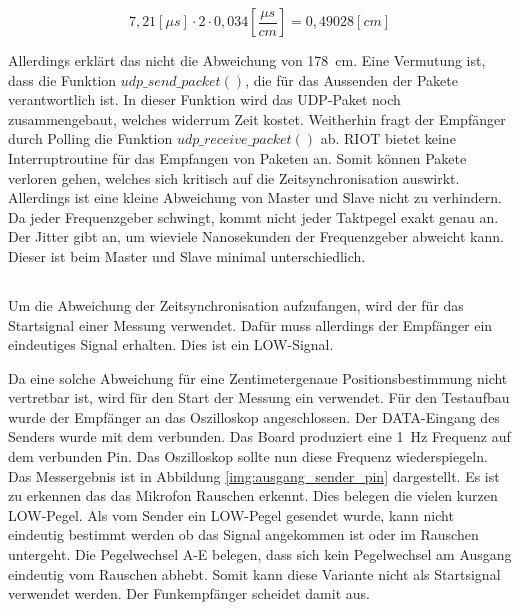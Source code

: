 \begin{equation}
\label{eq:abweichung_zeitsync}
7,21 [\si{\mu s}] \cdot  2 \cdot 0,034 [\frac{\si{\mu s}}{\si{cm}}] = 0,49028 [\si{cm}]
\end{equation}

Allerdings erklärt das nicht die Abweichung von \SI{178}{cm}. Eine Vermutung ist, dass die Funktion $udp\_send\_packet()$, die für das Aussenden der Pakete verantwortlich ist. In dieser Funktion wird das UDP-Paket noch zusammengebaut, welches widerrum Zeit kostet. Weitherhin fragt der Empfänger durch Polling die Funktion $udp\_receive\_packet()$ ab. RIOT bietet keine Interruptroutine für das Empfangen von Paketen an. Somit können Pakete verloren gehen, welches sich kritisch auf die Zeitsynchronisation auswirkt. Allerdings ist eine kleine Abweichung von Master und Slave nicht zu verhindern. Da jeder Frequenzgeber schwingt, kommt nicht jeder Taktpegel exakt genau an. Der Jitter gibt an, um wieviele Nanosekunden der Frequenzgeber abweicht kann. Dieser ist beim Master und Slave minimal unterschiedlich.

\subsection{\funkempfaenger}
Um die Abweichung der Zeitsynchronisation aufzufangen, wird der \funkempfaenger für das Startsignal einer Messung verwendet. Dafür muss allerdings der Empfänger ein eindeutiges Signal erhalten. Dies ist ein \si{LOW}-Signal. 


Da eine solche Abweichung für eine Zentimetergenaue Positionsbestimmung nicht vertretbar ist, wird für den Start der Messung ein \funkempfaenger \platz verwendet. Für den Testaufbau wurde der Empfänger an das Oszilloskop angeschlossen. Der \si{DATA}-Eingang des Senders wurde mit dem \board \platz verbunden. Das Board produziert eine \SI{1}{\hertz} Frequenz auf dem verbunden Pin. Das Oszilloskop sollte nun diese Frequenz wiederspiegeln. Das Messergebnis ist in Abbildung \ref{img:ausgang_sender_pin} dargestellt. Es ist zu erkennen das das Mikrofon Rauschen erkennt. Dies belegen die vielen kurzen \si{LOW}-Pegel. Als vom Sender ein \si{LOW}-Pegel gesendet wurde, kann nicht eindeutig bestimmt werden ob das Signal angekommen ist oder im Rauschen untergeht. Die Pegelwechsel A-E belegen, dass sich kein Pegelwechsel am Ausgang eindeutig vom Rauschen abhebt. Somit kann diese Variante nicht als Startsignal verwendet werden. Der Funkempfänger scheidet damit aus.

